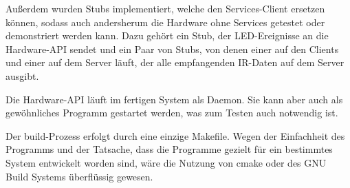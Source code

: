 Außerdem wurden Stubs implementiert, welche den Services-Client ersetzen können, sodass auch
andersherum die Hardware ohne Services getestet oder demonstriert werden kann.
Dazu gehört ein Stub, der LED-Ereignisse an die Hardware-API sendet und ein Paar von Stubs, von
denen einer auf den Clients und einer auf dem Server läuft, der alle empfangenden IR-Daten auf dem
Server ausgibt.

Die Hardware-API läuft im fertigen System als Daemon.
Sie kann aber auch als gewöhnliches Programm gestartet werden, was zum Testen auch notwendig ist.

Der build-Prozess erfolgt durch eine einzige Makefile.
Wegen der Einfachheit des Programms und der Tatsache, dass die Programme gezielt für ein bestimmtes
System entwickelt worden sind, wäre die Nutzung von cmake oder des GNU Build Systems überflüssig
gewesen.

